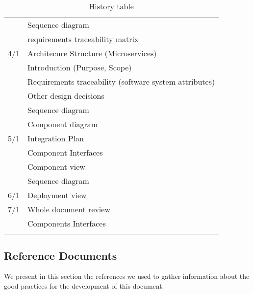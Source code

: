 \begin{center}
\begin{longtable}{ll}
         & Sequence diagram \\
         & requirements traceability matrix \\
        \hline
        4/1 & Architecure Structure (Microservices) \\
         & Introduction (Purpose, Scope) \\
         & Requirements traceability (software system attributes) \\
         & Other design decisions \\
         & Sequence diagram \\
         & Component diagram \\
        \hline
        5/1 & Integration Plan \\
         & Component Interfaces \\
         & Component view \\
         & Sequence diagram \\
        \hline
        6/1 & Deployment view \\
        \hline
        7/1 & Whole document review \\
         & Components Interfaces \\
        \hline
        
        \rowcolor{white}\caption{\label{tab:history}History table}
        
    \end{longtable}
\end{center}

\subsection{Reference Documents}
\label{sec:ref_docs}
We present in this section the references we used to gather information about the good practices for the development of this document.
\begingroup
\renewcommand{\section}[2]{}%
\nocite{*}


\endgroup


